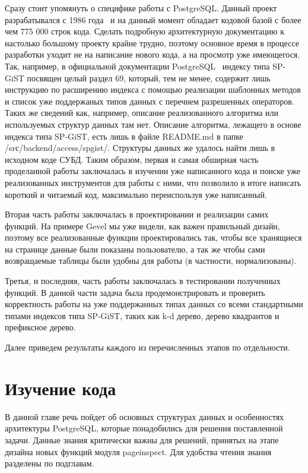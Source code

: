 \documentclass[12pt,oneside]{amsart}
\begin{document}
Сразу стоит упомянуть о специфике работы с PostgreSQL. Данный проект разрабатывался с 1986 года~\cite{postgresWiki} и на данный момент обладает кодовой базой с более чем 775 000 строк кода. Сделать подробную архитектурную документацию к настолько большому проекту крайне трудно, поэтому основное время в процессе разработки уходит не на написание нового кода, а на просмотр уже имеющегося. Так, например, в официальной документации PostgreSQL~\cite{postgresDoc} индексу типа SP-GiST посвящен целый раздел 69, который, тем не менее, содержит лишь инструкцию по расширению индекса с помощью реализации шаблонных методов и список уже поддержаных типов данных с перечнем разрешенных операторов. Таких же сведений как, например, описание реализованного алгоритма или используемых структур данных там нет. Описание алгоритма, лежащего в основе индекса типа SP-GiST, есть лишь в файле README.md в папке /srс/backend/access/spgist/. Структуры данных же удалось найти лишь в исходном коде СУБД. Таким образом, первая и самая обширная часть проделанной работы заключалась в изучении уже написанного кода и поиске уже реализованных инструментов для работы с ними, что позволило в итоге написать короткий и читаемый код, максимально переиспользуя уже написанный.

Вторая часть работы заключалась в проектировании и реализации самих функций. На примере Gevel мы уже видели, как важен правильный дизайн, поэтому все реализованные функции проектировались так, чтобы все хранящиеся на странице данные были показаны пользователю, а так же чтобы сами возвращаемые таблицы были удобны для работы (в частности, нормализованы).

Третья, и последняя, часть работы заключалась в тестировании полученных функций. В данной части задача была продемонстрировать и проверить корректность работы на уже поддержанных типах данных со всеми стандартными типами индексов типа SP-GiST, таких как k-d дерево, дерево квадрантов и префиксное дерево.

Далее приведем результаты каждого из перечисленных этапов по отдельности.


\section{Изучение кода}

В данной главе речь пойдет об основных структурах данных и особенностях архитектуры PostgreSQL, которые понадобились для решения поставленной задачи. Данные знания критически важны для решений, принятых на этапе дизайна новых функций модуля pageinspect. Для удобства чтения знания разделены по подглавам.
\end{document}
